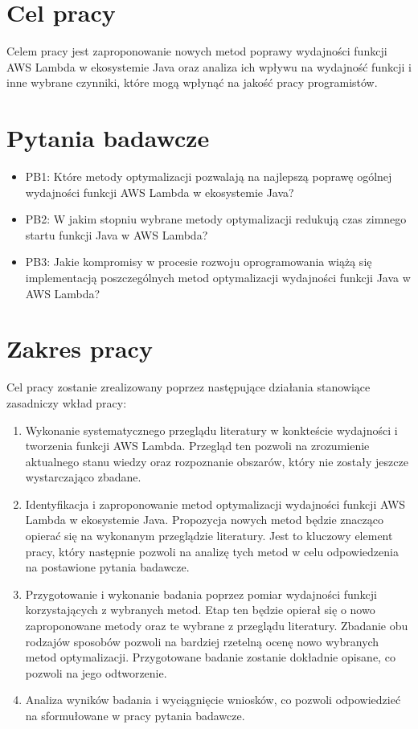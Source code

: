 \section*{Cel pracy}\label{chapter:cel_pracy}

Celem pracy jest zaproponowanie nowych metod poprawy wydajności funkcji AWS Lambda w ekosystemie Java oraz analiza ich wpływu na wydajność funkcji i inne wybrane czynniki, które mogą wpłynąć na jakość pracy programistów. 

\section*{Pytania badawcze}\label{chapter:pytania_badawcze}

\begin{itemize}
    \item PB1: Które metody optymalizacji pozwalają na najlepszą poprawę ogólnej wydajności funkcji AWS Lambda w ekosystemie Java?
    \item PB2: W jakim stopniu wybrane metody optymalizacji redukują czas zimnego startu funkcji Java w AWS Lambda?
    \item PB3: Jakie kompromisy w procesie rozwoju oprogramowania wiążą się implementacją poszczególnych metod optymalizacji wydajności funkcji Java w AWS Lambda?
\end{itemize}

\section*{Zakres pracy}\label{chapter:zakres_pracy}

Cel pracy zostanie zrealizowany poprzez następujące działania stanowiące zasadniczy wkład pracy:
\begin{enumerate}
    \item Wykonanie systematycznego przeglądu literatury w konkteście wydajności i tworzenia funkcji AWS Lambda. 
    Przegląd ten pozwoli na zrozumienie aktualnego stanu wiedzy oraz rozpoznanie obszarów, który nie zostały jeszcze wystarczająco zbadane. 
    \item Identyfikacja i zaproponowanie metod optymalizacji wydajności funkcji AWS Lambda w ekosystemie Java. 
    Propozycja nowych metod będzie znacząco opierać się na wykonanym przeglądzie literatury. 
    Jest to kluczowy element pracy, który następnie pozwoli na analizę tych metod w celu odpowiedzenia na postawione pytania badawcze.
    \item Przygotowanie i wykonanie badania poprzez pomiar wydajności funkcji korzystających z wybranych metod.
    Etap ten będzie opierał się o nowo zaproponowane metody oraz te wybrane z przeglądu literatury.
    Zbadanie obu rodzajów sposobów pozwoli na bardziej rzetelną ocenę nowo wybranych metod optymalizacji.
    Przygotowane badanie zostanie dokładnie opisane, co pozwoli na jego odtworzenie.
    \item Analiza wyników badania i wyciągnięcie wniosków, co pozwoli odpowiedzieć na sformułowane w pracy pytania badawcze. 
\end{enumerate}

